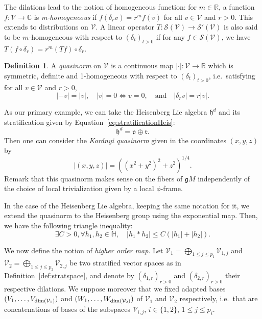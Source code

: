 \documentclass[12pt,a4paper]{amsart}
\theoremstyle{plain}
\theoremstyle{definition}
\newtheorem{definition}[theorem]{Definition}
\theoremstyle{remark}
\numberwithin{equation}{section}
\theoremstyle{definition}
\def\R{{\mathbb R}}%
\def\C{{\mathbb C}}%
\def \cV{\mathcal{V}}
\def \cS{\mathcal{S}}
\def \Heis{\mathbb{H}}
\def \fg{\mathfrak{g}}
\def \fh{\mathfrak{h}}
\def \fv{\mathfrak{v}}
\def \fr{\mathfrak{r}}
\numberwithin{equation}{section}
\begin{document}
The dilations lead to the notion of homogeneous function: for $m\in\R$, a function $f:\cV \rightarrow \C$ is \emph{m-homogeneous} if $f(\delta_r v)= r^{m} f(v)$ for all $v\in\cV$ and $r>0$. This extends to distributions on $\cV$. A linear operator $T:\cS(\cV)\rightarrow \cS'(\cV)$ is also said to be $m$-homogeneous with respect to $(\delta_t)_{t>0}$ if for any $f\in\cS(\cV)$, we have $T(f\circ\delta_r) = r^m (Tf)\circ\delta_r$.

\begin{definition}
    \label{def:quasinorm}
    A \emph{quasinorm} on $\cV$ is a continuous map $|\cdot|:\cV\rightarrow \R$ which is symmetric, definite and 1-homogeneous with respect to $(\delta_t)_{t>0}$, i.e.~satisfying
    for all $v\in\cV$ and $r>0$,
    \begin{equation*}
        |-v|=|v|,\quad |v|=0 \iff v=0,\quad \mbox{and}\quad |\delta_r v| = r|v|.
    \end{equation*}
\end{definition}

As our primary example, we can take the Heisenberg Lie algebra $\fh^d$ and its stratification given by Equation~\eqref{eq:stratificationHeis}:
\begin{equation*}
    \fh^d = \fv\oplus\fr.
\end{equation*}
Then one can consider the \emph{Kor\'anyi quasinorm} given in the coordinates $(x,y,z)$ by 
\begin{equation*}
    |(x,y,z)| = \left((x^2+y^2)^2+z^2\right)^{1/4}.
\end{equation*}
Remark that this quasinorm makes sense on the fibers of $\fg M$ independently of the choice of local trivialization given by a local $\phi$-frame.

In the case of the Heisenberg Lie algebra, keeping the same notation for it, we extend the quasinorm to the Heisenberg group using the exponential map. Then, we have the following triangle inequality:
\begin{equation*}
    \exists C>0, \forall h_1,h_2\in\Heis,\quad |h_1 * h_2|\leq C(|h_1|+|h_2|).
\end{equation*}

We now define the notion of \emph{higher order map}. Let $\cV_1 = \bigoplus_{1\leq j\leq p_1}\cV_{1,j}$ and $\cV_2= \bigoplus_{1\leq j\leq p_2}\cV_{2,j}$ be two stratified vector spaces as in Definition~\ref{def:stratspace}, and denote by $(\delta_{1,r})_{r>0}$ and $(\delta_{2,r})_{r>0}$ their respective dilations. We suppose moreover that we fixed adapted bases $(V_1,\dots,V_{{\rm dim}(\cV_1)})$ and $(W_1,\dots,W_{{\rm dim}(\cV_2)})$ of $\cV_1$ and $\cV_2$ respectively, i.e.~that are concatenations of bases of the subspaces $\cV_{i,j}$, $i\in\{1,2\}$, $1\leq j\leq p_i$.
\end{document}
